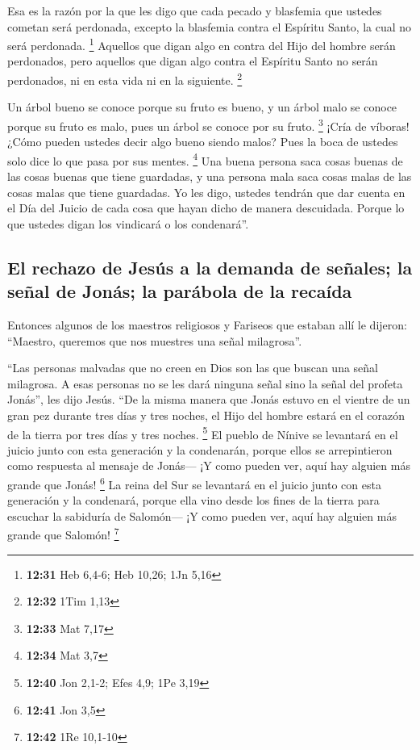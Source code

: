  Esa es la razón por la que les digo que cada pecado y
blasfemia que ustedes cometan será perdonada, excepto la blasfemia
contra el Espíritu Santo, la cual no será perdonada. \footnote{\textbf{12:31}
  Heb 6,4-6; Heb 10,26; 1Jn 5,16}  Aquellos que digan
algo en contra del Hijo del hombre serán perdonados, pero aquellos que
digan algo contra el Espíritu Santo no serán perdonados, ni en esta vida
ni en la siguiente. \footnote{\textbf{12:32} 1Tim 1,13}

 Un árbol bueno se conoce porque su fruto es bueno, y un
árbol malo se conoce porque su fruto es malo, pues un árbol se conoce
por su fruto. \footnote{\textbf{12:33} Mat 7,17}  ¡Cría
de víboras! ¿Cómo pueden ustedes decir algo bueno siendo malos? Pues la
boca de ustedes solo dice lo que pasa por sus mentes. \footnote{\textbf{12:34}
  Mat 3,7}  Una buena persona saca cosas buenas de las
cosas buenas que tiene guardadas, y una persona mala saca cosas malas de
las cosas malas que tiene guardadas.  Yo les digo,
ustedes tendrán que dar cuenta en el Día del Juicio de cada cosa que
hayan dicho de manera descuidada.  Porque lo que ustedes
digan los vindicará o los condenará''.

\hypertarget{el-rechazo-de-jesuxfas-a-la-demanda-de-seuxf1ales-la-seuxf1al-de-jonuxe1s-la-paruxe1bola-de-la-recauxedda}{%
\subsection{El rechazo de Jesús a la demanda de señales; la señal de
Jonás; la parábola de la
recaída}\label{el-rechazo-de-jesuxfas-a-la-demanda-de-seuxf1ales-la-seuxf1al-de-jonuxe1s-la-paruxe1bola-de-la-recauxedda}}

 Entonces algunos de los maestros religiosos y Fariseos
que estaban allí le dijeron: ``Maestro, queremos que nos muestres una
señal milagrosa''.

 ``Las personas malvadas que no creen en Dios son las que
buscan una señal milagrosa. A esas personas no se les dará ninguna señal
sino la señal del profeta Jonás'', les dijo Jesús.  ``De
la misma manera que Jonás estuvo en el vientre de un gran pez durante
tres días y tres noches, el Hijo del hombre estará en el corazón de la
tierra por tres días y tres noches. \footnote{\textbf{12:40} Jon 2,1-2;
  Efes 4,9; 1Pe 3,19}  El pueblo de Nínive se levantará
en el juicio junto con esta generación y la condenarán, porque ellos se
arrepintieron como respuesta al mensaje de Jonás--- ¡Y como pueden ver,
aquí hay alguien más grande que Jonás! \footnote{\textbf{12:41} Jon 3,5}
 La reina del Sur se levantará en el juicio junto con
esta generación y la condenará, porque ella vino desde los fines de la
tierra para escuchar la sabiduría de Salomón--- ¡Y como pueden ver, aquí
hay alguien más grande que Salomón! \footnote{\textbf{12:42} 1Re 10,1-10}

